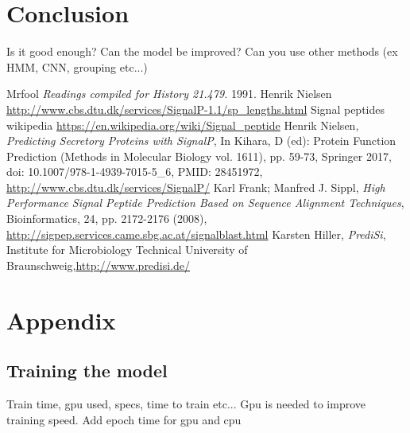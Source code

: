 \section{Conclusion}

Is it good enough? Can the model be improved? Can you use other methods (ex HMM, CNN, grouping etc...)


\newpage

\begin{thebibliography}{9}
 Mrfool {\em Readings compiled for History 21.479.} 1991.
 Henrik Nielsen \url{http://www.cbs.dtu.dk/services/SignalP-1.1/sp_lengths.html}
 Signal peptides wikipedia \url{https://en.wikipedia.org/wiki/Signal_peptide}
 Henrik Nielsen, {\em Predicting Secretory Proteins with SignalP}, In Kihara, D (ed): Protein Function Prediction (Methods in Molecular Biology vol. 1611),  pp. 59-73, Springer 2017, doi: 10.1007/978-1-4939-7015-5\_6, PMID: 28451972, \url{http://www.cbs.dtu.dk/services/SignalP/}  %
 Karl Frank; Manfred J. Sippl, {\em High Performance Signal Peptide Prediction Based on Sequence Alignment Techniques}, Bioinformatics, 24, pp. 2172-2176 (2008), \url{http://sigpep.services.came.sbg.ac.at/signalblast.html}
  Karsten Hiller,  {\em PrediSi}, Institute for Microbiology Technical University of Braunschweig,\url{http://www.predisi.de/}
\end{thebibliography}


\newpage

\section{Appendix}

\subsection{Training the model}
Train time, gpu used, specs, time to train etc...
Gpu is needed to improve training speed. Add epoch time for gpu and cpu

